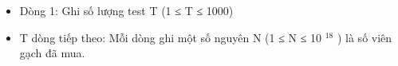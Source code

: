 \begin{itemize}
	\item Dòng 1: Ghi số lượng test T (1 ≤ T ≤ 1000)
	\item T dòng tiếp theo: Mỗi dòng ghi một số nguyên N (1 ≤ N ≤ 10 $^ 18 $ ) là số viên gạch đã mua.
\end{itemize}